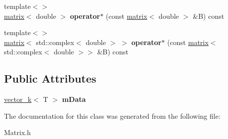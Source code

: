 \begin{DoxyCompactItemize}
\item 
\hypertarget{classkeycpp_1_1matrix_a0e9fdbebdf1d95dd225a2bd1310cba30}{{\footnotesize template$<$$>$ }\\\hyperlink{classkeycpp_1_1matrix}{matrix}$<$ double $>$ {\bfseries operator$\ast$} (const \hyperlink{classkeycpp_1_1matrix}{matrix}$<$ double $>$ \&B) const}\label{classkeycpp_1_1matrix_a0e9fdbebdf1d95dd225a2bd1310cba30}

\item 
\hypertarget{classkeycpp_1_1matrix_a0cbaef09170a16f74ed5acefa0f8ad3a}{{\footnotesize template$<$$>$ }\\\hyperlink{classkeycpp_1_1matrix}{matrix}$<$ std\-::complex$<$ double $>$ $>$ {\bfseries operator$\ast$} (const \hyperlink{classkeycpp_1_1matrix}{matrix}$<$ std\-::complex$<$ double $>$$>$ \&B) const}\label{classkeycpp_1_1matrix_a0cbaef09170a16f74ed5acefa0f8ad3a}

\end{DoxyCompactItemize}
\subsection*{Public Attributes}
\begin{DoxyCompactItemize}
\item 
\hypertarget{classkeycpp_1_1matrix_a6ddee82f1659df325d1d67f17d261c19}{\hyperlink{classkeycpp_1_1vector__k}{vector\-\_\-k}$<$ T $>$ {\bfseries m\-Data}}\label{classkeycpp_1_1matrix_a6ddee82f1659df325d1d67f17d261c19}

\end{DoxyCompactItemize}


The documentation for this class was generated from the following file\-:\begin{DoxyCompactItemize}
\item 
Matrix.\-h\end{DoxyCompactItemize}
